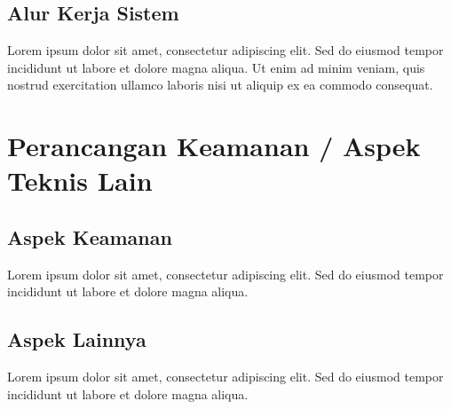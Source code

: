 \subsection{Alur Kerja Sistem}


Lorem ipsum dolor sit amet, consectetur adipiscing elit. Sed do eiusmod tempor incididunt ut labore et dolore magna aliqua. Ut enim ad minim veniam, quis nostrud exercitation ullamco laboris nisi ut aliquip ex ea commodo consequat.

\section{Perancangan Keamanan / Aspek Teknis Lain}


\subsection{Aspek Keamanan}

Lorem ipsum dolor sit amet, consectetur adipiscing elit. Sed do eiusmod tempor incididunt ut labore et dolore magna aliqua.

\subsection{Aspek Lainnya}

Lorem ipsum dolor sit amet, consectetur adipiscing elit. Sed do eiusmod tempor incididunt ut labore et dolore magna aliqua.
